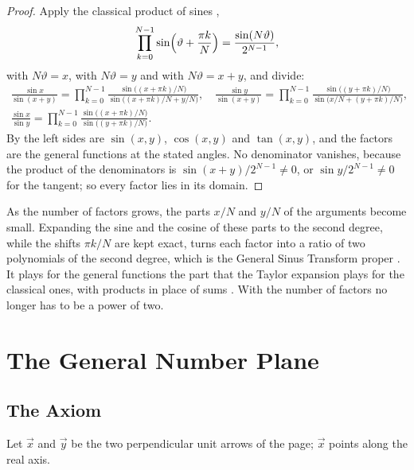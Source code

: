 \documentclass[11pt,a4paper]{amsart}
\theoremstyle{plain}
\theoremstyle{definition}
\theoremstyle{remark}
\begin{document}
\begin{proof}
Apply the classical product of sines \citep[\S 1.39]{GradshteynRyzhik2015},
\[
\prod_{k=0}^{N-1} \sin\Bigl(\vartheta + \frac{\pi k}{N}\Bigr) = \frac{\sin(N\vartheta)}{2^{N-1}} ,
\]
with $N\vartheta = x$, with $N\vartheta = y$ and with $N\vartheta = x + y$, and divide:
\begin{gather*}
\frac{\sin x}{\sin(x + y)} = \prod_{k=0}^{N-1} \frac{\sin\bigl((x + \pi k)/N\bigr)}{\sin\bigl((x + \pi k)/N + y/N\bigr)} , \quad \frac{\sin y}{\sin(x + y)} = \prod_{k=0}^{N-1} \frac{\sin\bigl((y + \pi k)/N\bigr)}{\sin\bigl(x/N + (y + \pi k)/N\bigr)} ,\\[2pt]
\frac{\sin x}{\sin y} = \prod_{k=0}^{N-1} \frac{\sin\bigl((x + \pi k)/N\bigr)}{\sin\bigl((y + \pi k)/N\bigr)} .
\end{gather*} By  the left sides are $\sin(x, y)$, $\cos(x, y)$ and $\tan(x, y)$, and the factors are the general functions at the stated angles. No denominator vanishes, because the product of the denominators is $\sin(x + y)/2^{N-1} \neq 0$, or $\sin y/2^{N-1} \neq 0$ for the tangent; so every factor lies in its domain.
\end{proof}

As the number of factors grows, the parts $x/N$ and $y/N$ of the arguments become small. Expanding the sine and the cosine of these parts to the second degree, while the shifts $\pi k/N$ are kept exact, turns each factor into a ratio of two polynomials of the second degree, which is the General Sinus Transform proper \citep[Theorem~6.3]{Derraz2026GSP}. It plays for the general functions the part that the Taylor expansion plays for the classical ones, with products in place of sums \citep[Remark~6.4]{Derraz2026GSP}. With  the number of factors no longer has to be a power of two.

\section{The General Number Plane}\label{sec:gnp}

\subsection{The Axiom}\label{subsec:axiom}

Let $\vec{x}$ and $\vec{y}$ be the two perpendicular unit arrows of the page; $\vec{x}$ points along the real axis.
\end{document}
